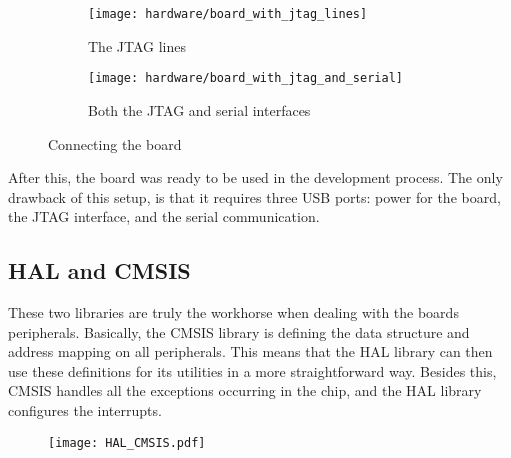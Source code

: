 \begin{figure}[H]
\centering
\begin{subfigure}{.5\textwidth}
  \centering
  \texttt{[image: hardware/board\_with\_jtag\_lines]}
  \caption{The JTAG lines}
  \label{fig:sub1}
\end{subfigure}%
\begin{subfigure}{.5\textwidth}
  \centering
  \texttt{[image: hardware/board\_with\_jtag\_and\_serial]}
  \caption{Both the JTAG and serial interfaces}
  \label{fig:sub2}
\end{subfigure}
\caption{Connecting the board}
\label{fig:photo2}
\end{figure}

After this, the board was ready to be used in the development process.
The only drawback of this setup, is that it requires three USB ports:
power for the board, the JTAG interface, and the serial communication.

\subsection{HAL and CMSIS}
These two libraries are truly the workhorse when dealing with the 
board\textquotesingle s peripherals. Basically, the CMSIS library
is defining the data structure and address mapping on all peripherals.
This means that the HAL library can then use these definitions for its
utilities in a more straightforward way. Besides this, CMSIS handles
all the exceptions occurring in the chip, and the HAL library configures
the interrupts.
 
\begin{figure}[H]
\centering
\texttt{[image: HAL\_CMSIS.pdf]}
\end{figure}

